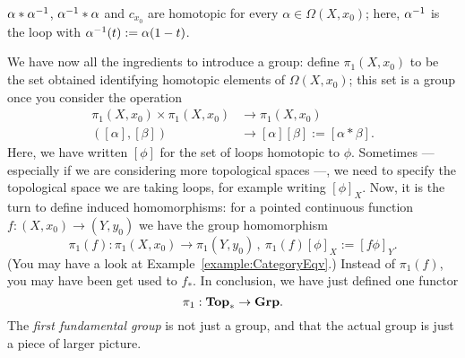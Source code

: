 \begin{example}
\begin{tcbitem}
  \item \(\alpha \ast \alpha^{-1}\), \(\alpha^{-1} \ast \alpha\) and
    \(c_{x_0}\) are homotopic for every \(\alpha \in \Omega(X, x_0)\);
    here, \(\alpha^{-1}\) is the loop with
    \(\alpha^{-1} (t) := \alpha (1-t)\).
  \end{tcbitem}
  We have now all the ingredients to introduce a group: define
  \(\pi_1(X, x_0)\) to be the set obtained identifying homotopic
  elements of \(\Omega(X, x_0)\); this set is a group once you
  consider the operation
  \[
    \begin{aligned}
      \pi_1(X, x_0) \times \pi_1(X, x_0) &\to \pi_1(X, x_0) \\
      ([\alpha], [\beta]) &\to [\alpha][\beta] := [\alpha \ast \beta] .
    \end{aligned}
  \]
  Here, we have written \([\phi]\) for the set of loops homotopic to
  \(\phi\). Sometimes --- especially if we are considering more
  topological spaces ---, we need to specify the topological space we
  are taking loops, for example writing \([\phi]_X\). Now, it is the
  turn to define induced homomorphisms: for a pointed continuous
  function \(f : (X, x_0) \to (Y, y_0)\) we have the group
  homomorphism
  \[\pi_1 (f) : \pi_1(X, x_0) \to \pi_1(Y, y_0)\,, \ \pi_1(f)[\phi]_X
    := [f \phi]_Y .\] (You may have a look at
  Example~\ref{example:CategoryEqv}.)  Instead of \(\pi_1(f)\), you
  may have been get used to \(f_\ast\). In conclusion, we have just
  defined one functor
  \[\pi_1 : \mathbf{Top}_\ast \to \mathbf{Grp} .\]
  The {\em first fundamental group} is not just a group, and that the
  actual group is just a piece of larger picture.
\end{example}


